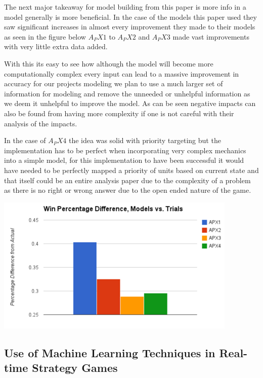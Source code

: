 \documentclass[a4paper,12pt]{report}
\begin{document}
The next major takeaway for model building from this paper is more info in a model generally is more beneficial. In the case of the models this paper used they saw significant increases in almost every improvement they made to their models as seen in the figure below $A_PX1$ to $A_PX2$ and $A_PX3$ made vast improvements with very little extra data added.

With this its easy to see how although the model will become more computationally complex every input can lead to a massive improvement in accuracy for our projects modeling we plan to use a much larger set of information for modeling and remove the unneeded or unhelpful information as we deem it unhelpful to improve the model. As can be seen negative impacts can also be found from having more complexity if one is not careful with their analysis of the impacts.

In the case of $A_PX4$ the idea was solid with priority targeting but the implementation has to be perfect when incorporating very complex mechanics into a simple model, for this implementation to have been successful it would have needed to be perfectly mapped a priority of units based on current state and that itself could be an entire analysis paper due to the complexity of a problem as there is no right or wrong answer due to the open ended nature of the game.

\begin{center}
    \captionsetup{type=figure}
    \includegraphics[width=.9\linewidth]{media/APXModelDiff.png}
\end{center}

\subsection{Use of Machine Learning Techniques in Real-time Strategy Games}
\end{document}
